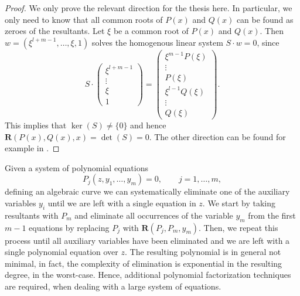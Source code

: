 \begin{proof}
  We only prove the relevant direction for the thesis here. In particular, we only need to know that all common roots of $P(x)$ and $Q(x)$ can be found as zeroes of the resultants. 
  Let $\xi$ be a common root of $P(x)$ and $Q(x)$. Then $w = (\xi^{l+m-1},\dots,\xi,1)$ solves the homogenous linear system $S\cdot w = 0$, since
  $$
   S \cdot \begin{pmatrix}\xi^{l+m-1}\\ \vdots \\ \xi \\ 1 \end{pmatrix}
   = \begin{pmatrix} \xi^{m-1}P(\xi) \\ \vdots \\ P(\xi) \\ \xi^{l-1}Q(\xi) \\ \vdots \\ Q(\xi)\end{pmatrix}.
   $$
	This implies that $\ker(S) \neq \{0\}$ and hence $\mathbf{R}(P(x),Q(x),x) = \det(S) = 0$. The other direction can be found for example in \cite[V.~10]{Lang}.
\end{proof}

\begin{remark}
  Given a system of polynomial equations
  $$
    P_j(z,y_1,\dots,y_m) = 0, \qquad j = 1, \dots, m,
  $$
  defining an algebraic curve we can systematically eliminate one of the auxiliary variables $y_i$ until we are left with a single equation in $z$.
  We start by taking resultants with $P_m$ and eliminate all occurrences of the variable $y_m$ from the first $m - 1$ equations by replacing $P_j$ with $\textbf{R}(P_j, P_m, y_m)$.
  Then, we repeat this process until all auxiliary variables have been eliminated and we are left with a single polynomial equation over $z$.
  The resulting polynomial is in general not minimal, in fact, the complexity of elimination is exponential in the resulting degree, in the worst-case. Hence, additional polynomial factorization techniques are required, when dealing with a large system of equations.
\end{remark}

